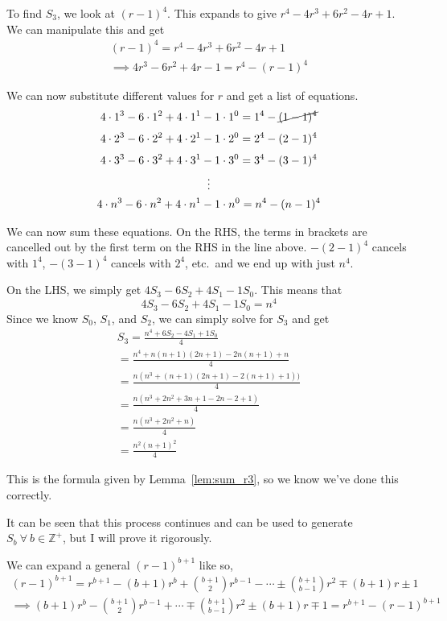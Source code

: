 \documentclass[a4paper]{article}
\newcommand{\zp}{\mathbb{Z}^+}
\begin{document}
To find $S_3$, we look at $(r-1)^4$. This expands to give $r^4 - 4r^3 + 6r^2 - 4r + 1$. We can manipulate this and get
\begin{gather*}
(r-1)^4 = r^4 - 4r^3 + 6r^2 - 4r + 1\\[0.5em]
\implies 4r^3 - 6r^2 + 4r - 1 = r^4 - (r-1)^4
\end{gather*}

We can now substitute different values for $r$ and get a list of equations.
\begin{gather*}
4 \cdot 1^3 - 6 \cdot 1^2 + 4 \cdot 1^1 - 1 \cdot 1^0 = 1^4 - \cancel{(1-1)^4}\\[0.3em]
4 \cdot 2^3 - 6 \cdot 2^2 + 4 \cdot 2^1 - 1 \cdot 2^0 = 2^4 - (2-1)^4\\[0.3em]
4 \cdot 3^3 - 6 \cdot 3^2 + 4 \cdot 3^1 - 1 \cdot 3^0 = 3^4 - (3-1)^4\\
\vdots\\
4 \cdot n^3 - 6 \cdot n^2 + 4 \cdot n^1 - 1 \cdot n^0 = n^4 - (n-1)^4
\end{gather*}

We can now sum these equations. On the RHS, the terms in brackets are cancelled out by the first term on the RHS in the line above. $-(2-1)^4$ cancels with $1^4$, $-(3-1)^4$ cancels with $2^4$, etc.\ and we end up with just $n^4$.

On the LHS, we simply get $4S_3 - 6S_2 + 4S_1 - 1S_0$. This means that $$4S_3 - 6S_2 + 4S_1 - 1S_0 = n^4$$ Since we know $S_0$, $S_1$, and $S_2$, we can simply solve for $S_3$ and get
\begin{gather*}
S_3 = \frac{n^4 + 6S_2 - 4S_1 + 1S_0}{4}\\[0.5em]
= \frac{n^4 + n(n+1)(2n+1) - 2n(n+1) + n}{4}\\[0.5em]
= \frac{n(n^3 + (n+1)(2n+1) - 2(n+1) + 1))}{4}\\[0.5em]
= \frac{n(n^3 + 2n^2 + 3n + 1 - 2n - 2 + 1)}{4}\\[0.5em]
= \frac{n(n^3 + 2n^2 + n)}{4}\\[0.5em]
= \frac{n^2(n+1)^2}{4}
\end{gather*}

This is the formula given by Lemma~\ref{lem:sum_r3}, so we know we've done this correctly.

It can be seen that this process continues and can be used to generate $S_b\ \forall\ b \in \zp$, but I will prove it rigorously.

We can expand a general $(r-1)^{b+1}$ like so,
\begin{gather*}
(r-1)^{b+1} = r^{b+1} - (b+1)r^b + \binom{b+1}{2}r^{b-1} - \cdots \pm \binom{b+1}{b-1}r^2 \mp (b+1)r \pm 1\\[0.5em]
\implies (b+1)r^b - \binom{b+1}{2}r^{b-1} + \cdots \mp \binom{b+1}{b-1}r^2 \pm (b+1)r \mp 1 = r^{b+1} - (r-1)^{b+1}
\end{gather*}
\end{document}
